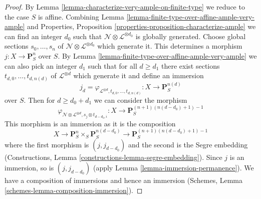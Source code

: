 \documentclass[10pt,a4paper]{amsart}
\theoremstyle{plain}
\theoremstyle{definition}
\theoremstyle{remark}
\numberwithin{equation}{subsection}
\begin{document}
\begin{proof}
By Lemma \ref{lemma-characterize-very-ample-on-finite-type}
we reduce to the case $S$ is affine. Combining
Lemma \ref{lemma-finite-type-over-affine-ample-very-ample} and
Properties, Proposition \ref{properties-proposition-characterize-ample}
we can find an integer $d_0$ such that
$\mathcal{N} \otimes \mathcal{L}^{\otimes d_0}$
is globally generated. Choose global sections
$s_0, \ldots, s_n$ of $\mathcal{N} \otimes \mathcal{L}^{\otimes d_0}$
which generate it. This determines a morphism
$j : X \to \mathbf{P}^n_S$ over $S$. By
Lemma \ref{lemma-finite-type-over-affine-ample-very-ample}
we can also pick an integer $d_1$ such that for all $d \geq d_1$
there exist sections $t_{d, 0}, \ldots, t_{d, n(d)}$
of $\mathcal{L}^{\otimes d}$ which generate it and define
an immersion
$$
j_d = \varphi_{\mathcal{L}^{\otimes d}, t_{d, 0}, \ldots, t_{d, n(d)}} :
X
\longrightarrow
\mathbf{P}^{n(d)}_S
$$
over $S$. Then for $d \geq d_0 + d_1$ we can consider the
morphism
$$
\varphi_{\mathcal{N} \otimes \mathcal{L}^{\otimes d},
s_j \otimes t_{d - d_0, i}} :
X
\longrightarrow
\mathbf{P}^{(n + 1)(n(d - d_0) + 1) - 1}_S
$$
This morphism is an immersion as it is the composition
$$
X \to \mathbf{P}^n_S \times_S \mathbf{P}^{n(d - d_0)}_S
\to \mathbf{P}^{(n + 1)(n(d - d_0) + 1) - 1}_S
$$
where the first morphism is $(j, j_{d - d_0})$ and
the second is the Segre embedding
(Constructions, Lemma \ref{constructions-lemma-segre-embedding}).
Since $j$ is an immersion, so is $(j, j_{d - d_0})$
(apply Lemma \ref{lemma-immersion-permanence}). We have a composition of
immersions and hence an immersion
(Schemes, Lemma \ref{schemes-lemma-composition-immersion}).
\end{proof}
\end{document}
